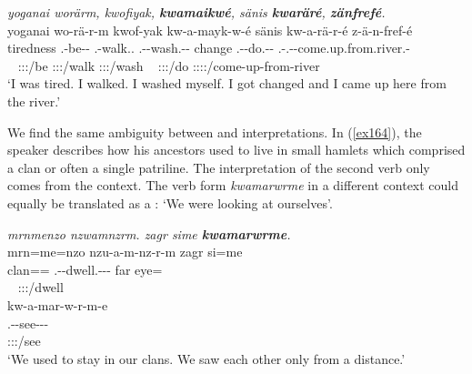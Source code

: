\begin{exe}
	\ex \emph{yoganai worärm, kwofiyak, \textbf{kwamaikwé}, sänis \textbf{kwaräré}, \textbf{zänfrefé}.}\\
	\glll yoganai wo-rä-r-m kwof-yak kw-a-mayk-w-é sänis kw-a-rä-r-é z-ä-n-fref-é\\
	tiredness \Fsg.\Alph-be-\Lk-\Dur{} \Fsg.\Betatwo-walk.\Ext.\Ndu{} \M.\Betaone-\Vc-wash.\Ext-\Ndu-\Fsg{} change \M.\Betaone-\Vc-do.\Ext-\Lk-\Fsg{} \M.\Gam-\Vc.\Ndu-\Venit-come.up.from.river.\Rs-\Fsg\\
	~ {\Fsg:\Sbj:\Rpst:\Dur/be} \footnotesize{\Fsg:\Sbj:\Rpst:\Ipfv/walk} \footnotesize{\Fsg:\Sbj:\Rpst:\Ipfv/wash} ~ {\Fsg:\Sbj:\Rpst:\Ipfv/do} \footnotesize{\Fsg:\Sbj:\Rpst:\Pfv:\Venit/come-up-from-river}\\
	\trans `I was tired. I walked. I washed myself. I got changed and I came up here from the river.' 
	\label{ex163}
\end{exe}

We find the same ambiguity between  and  interpretations. In (\ref{ex164}), the speaker describes how his ancestors used to live in small hamlets which comprised a clan or often a single patriline. The  interpretation of the second verb only comes from the context. The verb form \emph{kwamarwrme} in a different context could equally be translated as a : `We were looking at ourselves'.

\begin{exe}
	\ex \emph{mrnmenzo nzwamnzrm. zagr sime \textbf{kwamarwrme}.}\\
	\glll mrn=me=nzo nzu-a-m-nz-r-m zagr si=me\\
	clan=\Ins=\Only{} \Fnsg.\Betaone-\Vc-dwell.\Ext-\Ndu-\Lk-\Dur{} far eye=\Ins{}\\
	~ {\Fpl:\Sbj:\Pst:\Dur/dwell} ~ ~\\
	\sn
	\glll kw-a-mar-w-r-m-e\\
	\M.\Betaone-\Vc-see-\Lk-\Dur-\Fnsg\\
	\footnotesize{\Fpl:\Sbj:\Pst:\Dur/see}\\
	\trans `We used to stay in our clans. We saw each other only from a distance.'\\ 
	\label{ex164}
\end{exe}

